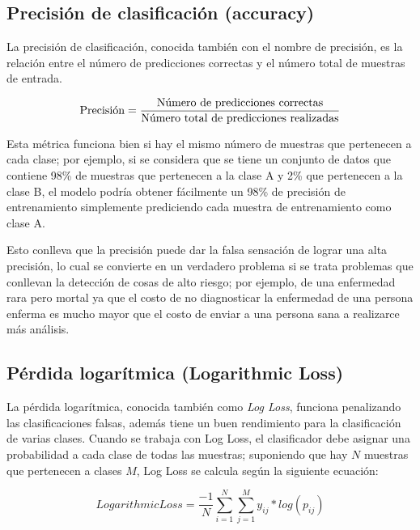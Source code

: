 \subsection{Precisi\'{o}n de clasificaci\'{o}n (accuracy)}

La precisi\'{o}n de clasificaci\'{o}n, conocida tambi\'{e}n con el nombre de precisi\'{o}n, es la relaci\'{o}n entre el n\'{u}mero de predicciones correctas y el n\'{u}mero total de muestras de entrada.

\begin{equation}
\textup{Precisi\'{o}n} = \frac{\textup{N\'{u}mero de predicciones correctas}}{\textup{N\'{u}mero total de predicciones realizadas}}
\end{equation}

Esta m\'{e}trica funciona bien si hay el mismo n\'{u}mero de muestras que pertenecen a cada clase; por ejemplo, si se considera que se tiene un conjunto de datos que contiene 98\% de muestras que pertenecen a la clase A y 2\% que pertenecen a la clase B, el modelo podr\'{i}a obtener f\'{a}cilmente un 98\% de precisi\'{o}n de entrenamiento simplemente prediciendo cada muestra de entrenamiento como clase A. 

\vspace{5mm} %

Esto conlleva que la precisi\'{o}n puede dar la falsa sensaci\'{o}n de lograr una alta precisi\'{o}n, lo cual se convierte en un verdadero problema si se trata problemas que conllevan la detecci\'{o}n de cosas de alto riesgo; por ejemplo, de una enfermedad rara pero mortal ya que el costo de no diagnosticar la enfermedad de una persona enferma es mucho mayor que el costo de enviar a una persona sana a realizarce  m\'{a}s an\'{a}lisis.

\subsection{P\'{e}rdida logar\'{i}tmica (Logarithmic Loss)}

La p\'{e}rdida logar\'{i}tmica, conocida tambi\'{e}n como \textit{Log Loss}, funciona penalizando las clasificaciones falsas, adem\'{a}s tiene un buen rendimiento para la clasificaci\'{o}n de varias clases. Cuando se trabaja con Log Loss, el clasificador debe asignar una probabilidad a cada clase de todas las muestras; suponiendo que hay $N$ muestras que pertenecen a clases $M$, Log Loss se calcula seg\'{u}n la siguiente ecuaci\'{o}n:

\begin{equation}
LogarithmicLoss = \frac{-1}{N}\sum_{i=1}^{N}\sum_{j=1}^{M} y_{ij}*log(p_{ij})
\end{equation}

